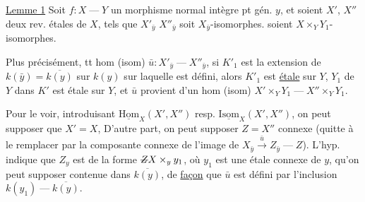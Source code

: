 
\uline{Lemme 1} Soit $f:X\mathbin{\text{---}}Y$ un morphisme    normal intègre pt gén. $y$, et soient $X'$, $X''$ deux rev. étales de $X$, tels que $X'_{\bar y}$   $X''_{\bar y}$ soit $X_{\bar y}$-isomorphes.   soient $X\times_Y Y_1$-isomorphes.

Plus précisément,  tt hom (isom) $\bar u:X'_{\bar y}\mathbin{\text{---}}X''_{\bar y}$, si $K'_1$ est la   extension de $k(\bar y)=\overline{k(y)}$ sur $k(y)$ sur laquelle  est défini, alors  $K'_1$ est \uline{étale} sur $Y$,   $Y_1$ de $Y$ dans $K'$ est étale sur $Y$, et $\bar u$ provient d'un hom (isom)  $X'\times_Y Y_1\mathbin{\text{---}} X''\times_Y Y_1$.

Pour le voir, introduisant $\underline{\mathrm{Hom}}_X(X',X'')$ resp. $\underline{\mathrm{Isom}}_X(X',X'')$, on peut supposer que $X'=X$, D'autre part, on peut supposer  $Z=X''$ connexe (quitte à le remplacer par la composante connexe de l'image de $X_{\bar y}\xrightarrow{\bar u} Z_{\bar y}\mathbin{\text{---}} Z$). L'hyp. indique que $Z_y$ est de la forme $\deleted{Z}X\times_y y_1$, où $y_1$ est une  étale connexe de $y$, qu'on peut supposer contenue dans $\overline{k(y)}$,  de \uline{façon} que $\bar u$ est défini par l'inclusion $k(y_1)\mathbin{\text{---}}\overline{k(y)}$.
